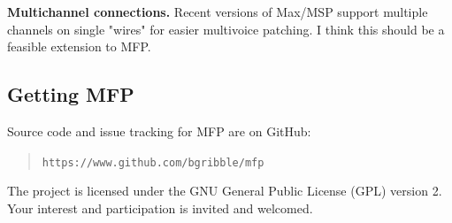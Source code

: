 \documentclass[a4paper]{article}
\begin{document}
{\bf Multichannel connections.} Recent versions of Max/MSP
support multiple channels on single "wires" for easier multivoice
patching. I think this should be a feasible extension to MFP.


\subsection{Getting MFP}

Source code and issue tracking for MFP are on GitHub:

\begin{quote}
\texttt{https://www.github.com/bgribble/mfp}
\end{quote}

The project is licensed under the GNU General Public License (GPL) version
2. Your interest and participation is invited and welcomed.

\nocite{*}


\end{document}
